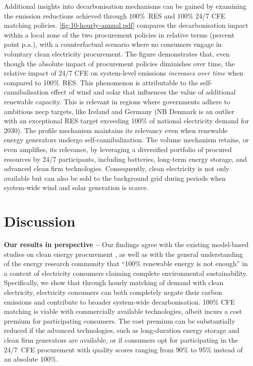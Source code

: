 \documentclass[11pt, 5p, nopreprintline]{elsarticle}
\begin{document}
Additional insights into decarbonisation mechanisms can be gained by examining the emission reductions achieved through 100\%~RES and 100\% 24/7 CFE matching policies.
\cref{fig:10-hourly-annual.pdf} compares the decarbonisation impact within a local zone of the two procurement policies in relative terms (percent point p.a.), with a counterfactual scenario where no consumers engage in voluntary clean electricity procurement.
The figure demonstrates that, even though the absolute impact of procurement policies diminishes over time, the relative impact of 24/7 CFE on system-level emissions \textit{increases over time} when compared to 100\%~RES.
This phenomenon is attributable to the self-cannibalisation effect of wind and solar that influences the value of additional renewable capacity.
This is relevant in regions where governments adhere to ambitious \gls{necp} targets, like Ireland and Germany (NB Denmark is an outlier with an exceptional RES target exceeding 100\% of national electricity demand for 2030).
The profile mechanism maintains its relevancy even when renewable energy generators undergo self-cannibalization.
The volume mechanism retains, or even amplifies, its relevance, by leveraging a diversified portfolio of procured resources by 24/7 participants, including batteries, long-term energy storage, and advanced clean firm technologies.
Consequently, clean electricity is not only available but can also be sold to the background grid during periods when system-wide wind and solar generation is scarce.


\section{Discussion}
\label{sec:discussion}

\textbf{Our results in perspective --} Our findings agree with the existing model-based studies on clean energy procurement \cite{xu-247CFE-SSRN,ieaAdvancingDecarbonisationClean2022,peninsula-report247}, as well as with the general understanding of the energy research community that \enquote{100\% renewable energy is not enough} \cite{chalendar-2019} in a context of electricity consumers claiming complete environmental sustainability.
Specifically, we show that through hourly matching of demand with clean electricity, electricity consumers can both completely negate their carbon emissions and contribute to broader system-wide decarbonisation.
100\% CFE matching is viable with commercially available technologies, albeit incurs a cost premium for participating consumers.
The cost premium can be substantially reduced if the advanced technologies, such as long-duration energy storage and clean firm generators are available, or if consumers opt for participating in the 24/7~CFE procurement with quality scores ranging from 90\% to 95\% instead of an absolute 100\%.
\end{document}
